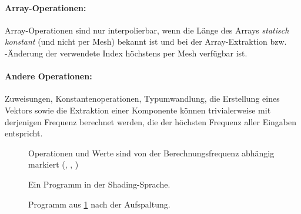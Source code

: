 \documentclass[twoside,a4paper,fleqn,12pt]{article}
\begin{document}


% 

\paragraph{Array-Operationen:} Array-Operationen sind nur interpolierbar, wenn die Länge des Arrays \emph{statisch konstant}
(und nicht per Mesh) bekannt ist und bei der Array-Extraktion bzw. -Änderung der verwendete Index höchstens per Mesh
verfügbar ist.

\paragraph{Andere Operationen:} Zuweisungen, Konstantenoperationen, Typumwandlung, die Erstellung eines Vektors sowie
die Extraktion einer Komponente können trivialerweise mit derjenigen Frequenz berechnet werden, die der höchsten Frequenz
aller Eingaben entspricht.

\begin{figure}[hp]
  
  \caption{Ein Programm in der Shading-Sprache.}
  \centering
  \small Operationen und Werte sind von der Berechnungsfrequenz abhängig markiert (, , )
  \label{fig:simple_s1}
\end{figure}

\begin{figure}[!ht]
  \centering
  
  \caption{Programm aus \ref{fig:simple_s1} nach der Aufspaltung.}
  \label{fig:simple_s1_split}
\end{figure}
\end{document}
